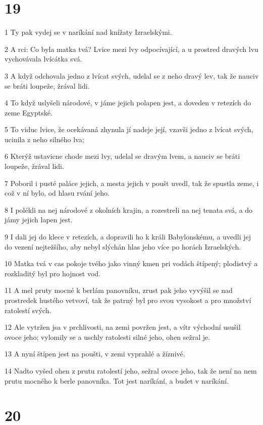\chapter{19}

\par 1 Ty pak vydej se v naríkání nad knížaty Izraelskými.
\par 2 A rci: Co byla matka tvá? Lvice mezi lvy odpocívající, a u prostred dravých lvu vychovávala lvícátka svá.
\par 3 A když odchovala jedno z lvícat svých, udelal se z neho dravý lev, tak že nauciv se bráti loupeže, žrával lidi.
\par 4 To když uslyšeli národové, v jáme jejich polapen jest, a doveden v retezích do zeme Egyptské.
\par 5 To viduc lvice, že ocekávaná zhynula jí nadeje její, vzavši jedno z lvícat svých, ucinila z neho silného lva;
\par 6 Kterýž ustavicne chode mezi lvy, udelal se dravým lvem, a nauciv se bráti loupeže, žrával lidi.
\par 7 Poboril i pusté paláce jejich, a mesta jejich v poušt uvedl, tak že spustla zeme, i což v ní bylo, od hlasu rvání jeho.
\par 8 I polékli na nej národové z okolních krajin, a rozestreli na nej tenata svá, a do jámy jejich lapen jest.
\par 9 I dali jej do klece v retezích, a dopravili ho k králi Babylonskému, a uvedli jej do vezení nejtežšího, aby nebyl slýchán hlas jeho více po horách Izraelských.
\par 10 Matka tvá v cas pokoje tvého jako vinný kmen pri vodách štípený; plodistvý a rozkladitý byl pro hojnost vod.
\par 11 A mel pruty mocné k berlám panovníku, zrust pak jeho vyvýšil se nad prostredek hustého vetvoví, tak že patrný byl pro svou vysokost a pro množství ratolestí svých.
\par 12 Ale vytržen jsa v prchlivosti, na zemi povržen jest, a vítr východní usušil ovoce jeho; vylomily se a uschly ratolesti silné jeho, ohen sežral je.
\par 13 A nyní štípen jest na poušti, v zemi vyprahlé a žíznivé.
\par 14 Nadto vyšed ohen z prutu ratolestí jeho, sežral ovoce jeho, tak že není na nem prutu mocného k berle panovníka. Tot jest naríkání, a budet v naríkání.

\chapter{20}

